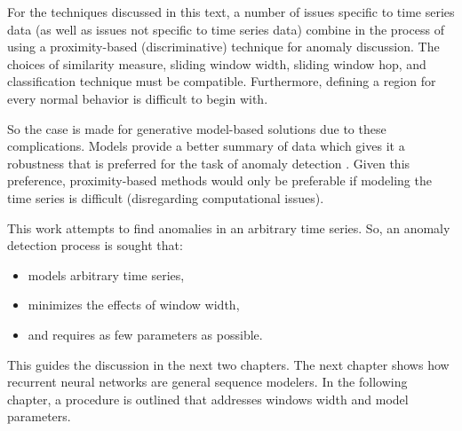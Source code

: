 For the techniques discussed in this text, a number of issues specific to time series data (as well as issues not specific to time series data) combine in the process of using a proximity-based (discriminative) technique for anomaly discussion. The choices of similarity measure, sliding window width, sliding window hop, and classification technique must be compatible. Furthermore, defining a region for every normal behavior is difficult to begin with.

So the case is made for generative model-based solutions due to these complications. Models provide a better summary of data which gives it a robustness that is preferred for the task of anomaly detection \cite{Ngkvist2014}. Given this preference, proximity-based methods would only be preferable if modeling the time series is difficult (disregarding computational issues).

This work attempts to find anomalies in an arbitrary time series. So, an anomaly detection process is sought that:
\begin{itemize}
\item models arbitrary time series,
\item minimizes the effects of window width,
\item and requires as few parameters as possible.
\end{itemize}

This guides the discussion in the next two chapters. The next chapter shows how recurrent neural networks are general sequence modelers. In the following chapter, a procedure is outlined that addresses windows width and model parameters.



